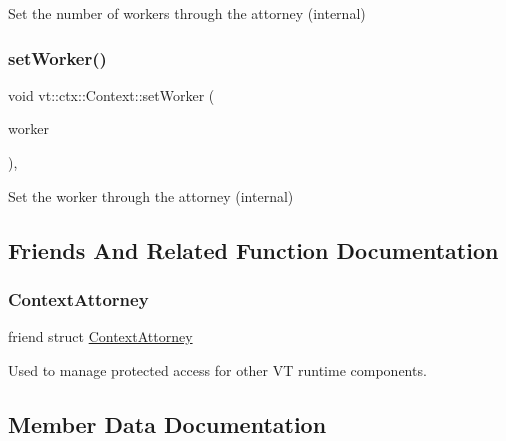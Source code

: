 Set the number of workers through the attorney (internal) 

\mbox{\label{structvt_1_1ctx_1_1_context_a32f62f26b7a6977c91186f8c2aa2b16a}} 
\subsubsection{\texorpdfstring{set\+Worker()}{setWorker()}}
{\footnotesize\ttfamily void vt\+::ctx\+::\+Context\+::set\+Worker (\begin{DoxyParamCaption}\item[{\hyperlink{namespacevt_a656e362091da17b9b93d0655b36e3392}{Worker\+I\+D\+Type} const}]{worker }\end{DoxyParamCaption})\hspace{0.3cm}{\ttfamily [inline]}, {\ttfamily [protected]}}



Set the worker through the attorney (internal) 



\subsection{Friends And Related Function Documentation}
\mbox{\label{structvt_1_1ctx_1_1_context_a75c33a90ea59b21ab5375343af0f8e26}} 
\subsubsection{\texorpdfstring{Context\+Attorney}{ContextAttorney}}
{\footnotesize\ttfamily friend struct \hyperlink{structvt_1_1ctx_1_1_context_attorney}{Context\+Attorney}\hspace{0.3cm}{\ttfamily [friend]}}



Used to manage protected access for other VT runtime components. 



\subsection{Member Data Documentation}
\mbox{\label{structvt_1_1ctx_1_1_context_ac9f5afa2cb9a6c06c8570bbf25cde926}} 
